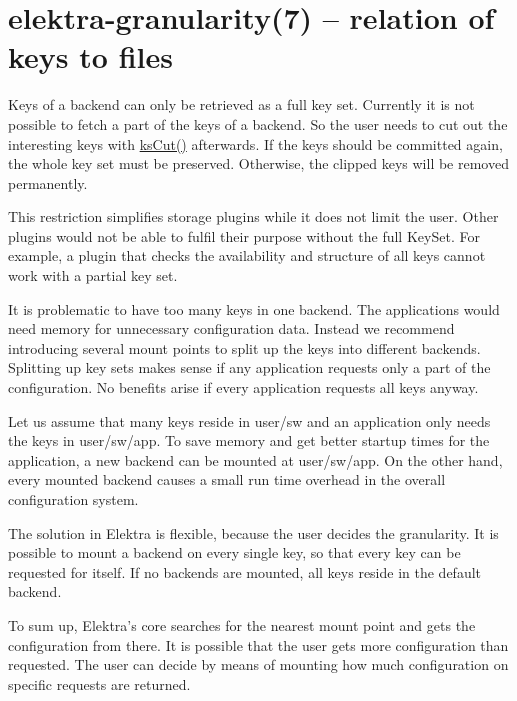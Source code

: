 \section*{elektra-\/granularity(7) -- relation of keys to files }

Keys of a backend can only be retrieved as a full key set. Currently it is not possible to fetch a part of the keys of a backend. So the user needs to cut out the interesting keys with {\ttfamily \hyperlink{group__keyset_ga6b00cf82b59af4d883a9bad6cf4a4a4a}{ks\+Cut()}} afterwards. If the keys should be committed again, the whole key set must be preserved. Otherwise, the clipped keys will be removed permanently.

This restriction simplifies storage plugins while it does not limit the user. Other plugins would not be able to fulfil their purpose without the full {\ttfamily Key\+Set}. For example, a plugin that checks the availability and structure of all keys cannot work with a partial key set.

It is problematic to have too many keys in one backend. The applications would need memory for unnecessary configuration data. Instead we recommend introducing several mount points to split up the keys into different backends. Splitting up key sets makes sense if any application requests only a part of the configuration. No benefits arise if every application requests all keys anyway.

Let us assume that many keys reside in {\ttfamily user/sw} and an application only needs the keys in {\ttfamily user/sw/app}. To save memory and get better startup times for the application, a new backend can be mounted at {\ttfamily user/sw/app}. On the other hand, every mounted backend causes a small run time overhead in the overall configuration system.

The solution in Elektra is flexible, because the user decides the granularity. It is possible to mount a backend on every single key, so that every key can be requested for itself. If no backends are mounted, all keys reside in the default backend.

To sum up, Elektra's core searches for the nearest mount point and gets the configuration from there. It is possible that the user gets more configuration than requested. The user can decide by means of mounting how much configuration on specific requests are returned. 